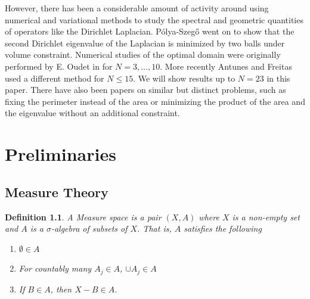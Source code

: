 \documentclass[12pt]{report}
\newtheorem{definition}{Definition}
\numberwithin{definition}{section}
\begin{document}
However, there has been a considerable amount of activity around using numerical and variational methods to study the spectral and geometric quantities of operators like the Dirichlet Laplacian.
Pólya-Szegő went on to show that the second Dirichlet eigenvalue of the Laplacian is minimized by two balls under volume constraint.
Numerical studies of the optimal domain were originally performed by E. Oudet in \cite{oudet} for $N=3,\ldots,10$.
More recently Antunes and Freitas \cite{freitas} used a different method for $N \leq 15$.
We will show results up to $N = 23$ in this paper.
There have also been papers on similar but distinct problems, such as fixing the perimeter instead of the area or minimizing the product of the area and the eigenvalue without an additional constraint.


\break



%
%
%
%
%
%
%
%
%

\chapter {Preliminaries}

\break


\section{Measure Theory}

\begin{definition}
  A Measure space is a pair $(X,A)$ where $X$ is a non-empty set and $A$ is a $\sigma$-algebra of subsets of $X$.
  That is, $A$ satisfies the following
  \begin{enumerate}
    \item $\emptyset \in A$
    \item For countably many $A_{j} \in A$, $\cup A_{j} \in A$ 
    \item If $B \in A$, then $X - B \in A$.
  \end{enumerate}
\end{definition}
\end{document}
